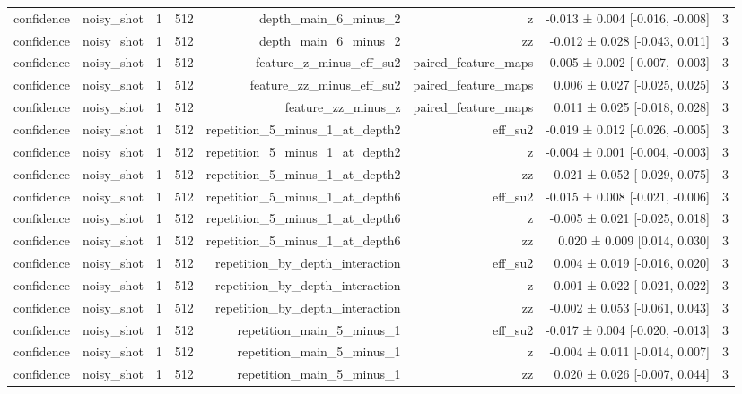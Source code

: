 \begin{table}
\begin{tabular}{lrrrrrrr}
confidence & noisy\_shot & 1 & 512 & depth\_main\_6\_minus\_2 & z & -0.013 ± 0.004 [-0.016, -0.008] & 3 \\
confidence & noisy\_shot & 1 & 512 & depth\_main\_6\_minus\_2 & zz & -0.012 ± 0.028 [-0.043, 0.011] & 3 \\
confidence & noisy\_shot & 1 & 512 & feature\_z\_minus\_eff\_su2 & paired\_feature\_maps & -0.005 ± 0.002 [-0.007, -0.003] & 3 \\
confidence & noisy\_shot & 1 & 512 & feature\_zz\_minus\_eff\_su2 & paired\_feature\_maps & 0.006 ± 0.027 [-0.025, 0.025] & 3 \\
confidence & noisy\_shot & 1 & 512 & feature\_zz\_minus\_z & paired\_feature\_maps & 0.011 ± 0.025 [-0.018, 0.028] & 3 \\
confidence & noisy\_shot & 1 & 512 & repetition\_5\_minus\_1\_at\_depth2 & eff\_su2 & -0.019 ± 0.012 [-0.026, -0.005] & 3 \\
confidence & noisy\_shot & 1 & 512 & repetition\_5\_minus\_1\_at\_depth2 & z & -0.004 ± 0.001 [-0.004, -0.003] & 3 \\
confidence & noisy\_shot & 1 & 512 & repetition\_5\_minus\_1\_at\_depth2 & zz & 0.021 ± 0.052 [-0.029, 0.075] & 3 \\
confidence & noisy\_shot & 1 & 512 & repetition\_5\_minus\_1\_at\_depth6 & eff\_su2 & -0.015 ± 0.008 [-0.021, -0.006] & 3 \\
confidence & noisy\_shot & 1 & 512 & repetition\_5\_minus\_1\_at\_depth6 & z & -0.005 ± 0.021 [-0.025, 0.018] & 3 \\
confidence & noisy\_shot & 1 & 512 & repetition\_5\_minus\_1\_at\_depth6 & zz & 0.020 ± 0.009 [0.014, 0.030] & 3 \\
confidence & noisy\_shot & 1 & 512 & repetition\_by\_depth\_interaction & eff\_su2 & 0.004 ± 0.019 [-0.016, 0.020] & 3 \\
confidence & noisy\_shot & 1 & 512 & repetition\_by\_depth\_interaction & z & -0.001 ± 0.022 [-0.021, 0.022] & 3 \\
confidence & noisy\_shot & 1 & 512 & repetition\_by\_depth\_interaction & zz & -0.002 ± 0.053 [-0.061, 0.043] & 3 \\
confidence & noisy\_shot & 1 & 512 & repetition\_main\_5\_minus\_1 & eff\_su2 & -0.017 ± 0.004 [-0.020, -0.013] & 3 \\
confidence & noisy\_shot & 1 & 512 & repetition\_main\_5\_minus\_1 & z & -0.004 ± 0.011 [-0.014, 0.007] & 3 \\
confidence & noisy\_shot & 1 & 512 & repetition\_main\_5\_minus\_1 & zz & 0.020 ± 0.026 [-0.007, 0.044] & 3 \\

\end{tabular}
\end{table}
